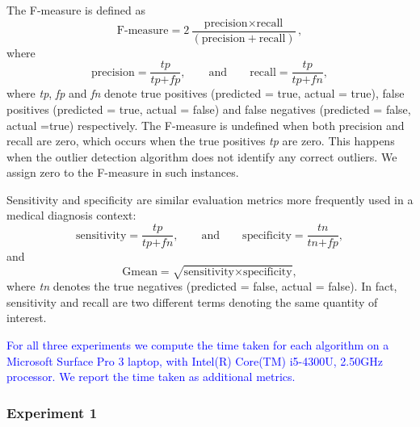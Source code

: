 \documentclass[12pt]{article}
\theoremstyle{definition}
\theoremstyle{definition}
\theoremstyle{definition}
\theoremstyle{definition}
\theoremstyle{remark}
\begin{document}
The F-measure is defined as
\begin{equation}\label{eq:fmeasure}
    \text{F-measure} = 2\frac{\text{precision} \times \text{recall}}{\left( \text{precision} + \text{recall} \right) }  ,
\end{equation}
where
\begin{equation}\label{eq:pr}
    \text{precision} = \frac{ \textit{tp} }{\textit{tp} + \textit{fp}}  , \qquad \text{and} \qquad \text{recall} = \frac{\textit{tp}}{\textit{tp} + \textit{fn}}  ,
\end{equation}
where \emph{tp}, \emph{fp} and \emph{fn} denote true positives (predicted = true, actual = true), false positives (predicted = true, actual = false) and false negatives (predicted = false, actual =true) respectively. The F-measure is undefined when both precision and recall are zero, which occurs when the true positives \emph{tp} are zero. This happens when the outlier detection algorithm does not identify any correct outliers. We assign zero to the F-measure in such instances.

Sensitivity and specificity are similar evaluation metrics more frequently used in a medical diagnosis context:
\begin{equation}\label{eq:ss}
    \text{sensitivity} = \frac{ \textit{tp} }{\textit{tp} + \textit{fn}}  , \qquad \text{and} \qquad \text{specificity} = \frac{\textit{tn}}{\textit{tn} + \textit{fp}}  ,
\end{equation}
and
\begin{equation}\label{eq:gmean}
    \text{Gmean} = \sqrt{ \text{sensitivity} \times \text{specificity}}  ,
\end{equation}
where \emph{tn} denotes the true negatives (predicted = false, actual = false). In fact, sensitivity and recall are two different terms denoting the same quantity of interest.

\textcolor{blue}{For all three experiments we compute the time taken for each algorithm on a Microsoft Surface Pro 3 laptop, with Intel(R) Core(TM) i5-4300U, 2.50GHz processor. We report the time taken as additional metrics.}

\hypertarget{experiment-1}{%
\subsubsection*{Experiment 1}\label{experiment-1}}
\end{document}

